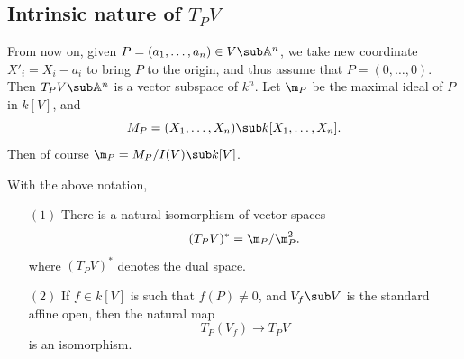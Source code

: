 \subsection{Intrinsic nature of \boldmath$T_PV$}
From now on, given $P=(a_1,\dots,a_n)\in V\sub\mathbb{A}^n$, we take new coordinate $X'_i=X_i-a_i$ to bring $P$ to the origin, and thus assume that $P=(0,\dots,0)$. Then $T_PV\sub\mathbb{A}^n$ is a vector subspace of $k^n$. Let $\m_P$ be the maximal ideal of $P$ in $k[V]$, and 
\[M_P=(X_1,\dots,X_n)\sub k[X_1,\dots,X_n].\]
Then of course $\m_P=M_P/I(V)\sub k[V]$.
\begin{theorem}
With the above notation,
\begin{itemize}
\item[$(1)$] There is a natural isomorphism of vector spaces
\[(T_PV)^*=\m_P/\m_P^2.\]
where $(T_PV)^*$ denotes the dual space.
\item[$(2)$] If $f\in k[V]$ is such that $f(P)\neq0$, and $V_f\sub V$ is the standard affine open, then the natural map
\[T_P(V_f)\to T_PV\]
is an isomorphism.
\end{itemize}
\end{theorem}
